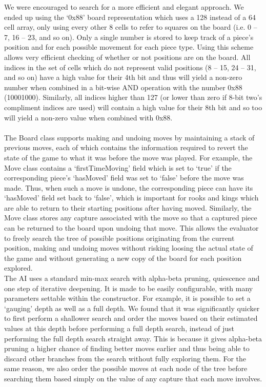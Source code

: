 \documentclass{l3proj}
\begin{document}
We were encouraged to search for a more efficient and elegant approach. We ended up using the ‘0x88' board representation which uses a 128 instead of a 64 cell array, only using every other 8 cells to refer to squares on the board (i.e. 0 – 7, 16 – 23, and so on). Only a single number is stored to keep track of a piece’s position and for each possible movement for each piece type. Using this scheme allows very efficient checking of whether or not positions are on the board. All indices in the set of cells which do not represent valid positions (8 – 15, 24 – 31, and so on) have a high value for their 4th bit and thus will yield a non-zero number when combined in a bit-wise AND operation with the number 0x88 (10001000). Similarly, all indices higher than 127 (or lower than zero if 8-bit two’s compliment indices are used) will contain a high value for their 8th bit and so too will yield a non-zero value when combined with 0x88.\\\\

The Board class supports making and undoing moves by maintaining a stack of previous moves, each of which contains the information required to revert the state of the game to what it was before the move was played. For example, the Move class contains a ‘firstTimeMoving’ field which is set to ‘true’ if the corresponding piece’s ‘hasMoved’ field was set to ‘false’ before the move was made. Thus, when such a move is undone, the corresponding piece can have its ‘hasMoved’ field set back to ‘false’, which is important for rooks and kings which are able to return to their starting positions after having moved. Similarly, the Move class stores any capture associated with the move so that a captured piece can be returned to the board upon undoing that move. This allows the evaluator to freely search the tree of possible positions originating from the current position, making and undoing moves without risking loosing the actual state of the game and without generating a new copy of the board for each position explored. \\

The AI uses a standard min-max search with alpha-beta pruning, quiescence and one step of iterative deepening. It is made to be easily configurable, with many parameters settable within the constructor. For example, it is possible to set a ‘gauging’ depth as well as a full depth. We found that it was significantly quicker to first perform a shallower search and order the moves based on their estimated values at this depth before performing a full depth search, instead of just performing the full depth search straight away. This is because it gives alpha-beta pruning a higher chance of finding better moves earlier and thus being able to discard other branches from the search without fully exploring them. For the same reason, we also order the possible moves at each node of the tree before searching them based simply on the value of any capture that each move involves. \\
\end{document}
